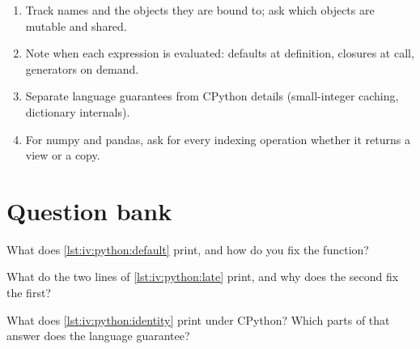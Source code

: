 \begin{method}\label{met:iv:python:output}
\begin{enumerate}
\item Track names and the objects they are bound to; ask which objects are mutable and shared.
\item Note when each expression is evaluated: defaults at definition, closures at call, generators on demand.
\item Separate language guarantees from CPython details (small-integer caching, dictionary internals).
\item For numpy and pandas, ask for every indexing operation whether it returns a view or a copy.
\end{enumerate}
\end{method}

\section{Question bank}

\begin{interviewq}\label{iq:iv:python:1}
What does \cref{lst:iv:python:default} print, and how do you fix the function?
\end{interviewq}

\label{lst:iv:python:late}

\begin{interviewq}\label{iq:iv:python:2}
What do the two lines of \cref{lst:iv:python:late} print, and why does the second fix the first?
\end{interviewq}

\label{lst:iv:python:identity}

\begin{interviewq}\label{iq:iv:python:3}
What does \cref{lst:iv:python:identity} print under CPython? Which parts of that answer does the language guarantee?
\end{interviewq}

\label{lst:iv:python:gen}

